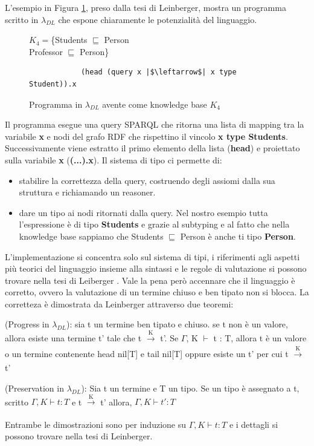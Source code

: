     L'esempio in Figura \ref{lambda_DL_ex}, preso dalla tesi di Leinberger, mostra un programma scritto in $\lambda_{DL}$ che espone chiaramente le potenzialità del linguaggio.
    \begin{figure}[h]
        \captionsetup{singlelinecheck = false}
        $K_4 = $\{Students $\sqsubseteq$ Person
        \\Professor $\sqsubseteq$ Person\}
        \begin{verbatim}
            (head (query x |$\leftarrow$| x type Student)).x
        \end{verbatim}
        \caption{Programma in $\lambda_{DL}$ avente come knowledge base $K_4$}
        \label{lambda_DL_ex}
    \end{figure}
   
   Il programma esegue una query SPARQL che ritorna una lista di mapping tra la variabile \textbf{x} e nodi del grafo RDF che rispettino il vincolo
    \textbf{x type Students}. Successivamente viene estratto il primo elemento della lista (\textbf{head}) e proiettato sulla variabile \textbf{x} (\textbf{(...).x}).
    Il sistema di tipo ci permette di:
    \begin{itemize}
        \item stabilire la correttezza della query, costruendo degli assiomi dalla sua struttura e richiamando un reasoner.
        \item dare un tipo ai nodi ritornati dalla query. Nel nostro esempio tutta l'espressione è di tipo \textbf{Students} e grazie al subtyping e al fatto
            che nella knowledge base sappiamo che Students $\sqsubseteq$ Person è anche ti tipo \textbf{Person}.
    \end{itemize}
    L'implementazione si concentra solo sul sistema di tipi, i riferimenti agli aspetti più teorici del linguaggio insieme alla sintassi e le regole di valutazione
    si possono trovare nella tesi di Leiberger \cite{leinbergerphdthesis}.
    Vale la pena per\`o accennare che il linguaggio è corretto, ovvero la valutazione di un termine chiuso e ben tipato non si blocca.
    La corretteza è dimostrata da Leinberger attraverso due teoremi:
    \begin{theorem}
        (Progress in $\lambda_{DL}$): sia t un termine ben tipato e chiuso. se t non è un valore, allora esiste una termine t' tale che
        t $\xrightarrow[]{\text{K}}$ t'. Se $\Gamma$, K $\vdash$ t : T, allora t è un valore o un termine contenente head nil[T] e tail nil[T] oppure esiste
        un t' per cui t $\xrightarrow[]{\text{K}}$ t'
    \end{theorem}
    \begin{theorem}
        (Preservation in $\lambda_{DL}$): Sia t un termine e T un tipo. Se un tipo è assegnato a t, scritto $\Gamma,K \vdash t : T$ e t $\xrightarrow[]{\text{K}}$ t'
        allora, $\Gamma,K \vdash t' : T$
    \end{theorem}
    Entrambe le dimostrazioni sono per induzione su $\Gamma,K \vdash t : T$ e i dettagli si possono trovare nella tesi di Leinberger.

